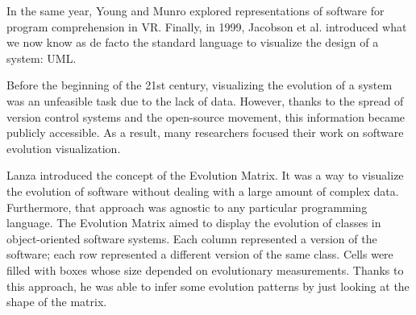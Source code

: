 In the same year, Young and Munro \cite{Young1998} explored representations of software for program comprehension in VR. 
Finally, in 1999, Jacobson et al. \cite{Jacobson1999} introduced what we now know as de facto the standard language to visualize the design of a system: UML. 



Before the beginning of the 21st century, visualizing the evolution of a system was an unfeasible task due to the lack of data. 
However, thanks to the spread of version control systems and the open-source movement, this information became publicly accessible.
As a result, many researchers focused their work on software evolution visualization.

Lanza \cite{Lanza2001} introduced the concept of the Evolution Matrix. It was a way to visualize the evolution of software without dealing with a large amount of complex data. 
Furthermore, that approach was agnostic to any particular programming language. The Evolution Matrix aimed to display the evolution of classes in object-oriented software systems. 
Each column represented a version of the software; each row represented a different version of the same class. Cells were filled with boxes whose size depended on evolutionary measurements. 
Thanks to this approach, he was able to infer some evolution patterns by just looking at the shape of the matrix.



